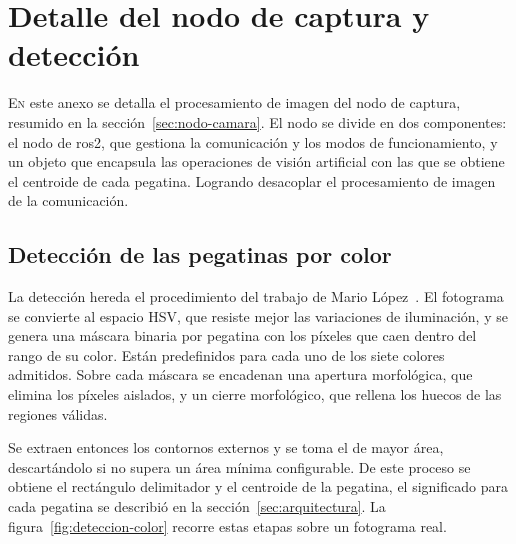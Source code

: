 \chapter{Detalle del nodo de captura y detección}
\label{chap:anexo-captura}

\lettrine{E}{n} este anexo se detalla el procesamiento de imagen del nodo de captura, resumido en la sección~\ref{sec:nodo-camara}. El nodo se divide en dos componentes: el nodo de \gls{ros2}, que gestiona la comunicación y los modos de funcionamiento, y un objeto que encapsula las operaciones de visión artificial con las que se obtiene el centroide de cada pegatina. Logrando desacoplar el procesamiento de imagen de la comunicación.

\section{Detección de las pegatinas por color}
\label{subsec:deteccion-etiquetas}

La detección hereda el procedimiento del trabajo de Mario López~\cite{tfgmario}. El fotograma se convierte al espacio HSV, que resiste mejor las variaciones de iluminación, y se genera una máscara binaria por pegatina con los píxeles que caen dentro del rango de su color. Están predefinidos para cada uno de los siete colores admitidos. Sobre cada máscara se encadenan una apertura morfológica, que elimina los píxeles aislados, y un cierre morfológico, que rellena los huecos de las regiones válidas.

Se extraen entonces los contornos externos y se toma el de mayor área, descartándolo si no supera un área mínima configurable. De este proceso se obtiene el rectángulo delimitador y el centroide de la pegatina, el significado para cada pegatina se describió en la sección~\ref{sec:arquitectura}. La figura~\ref{fig:deteccion-color} recorre estas etapas sobre un fotograma real.

